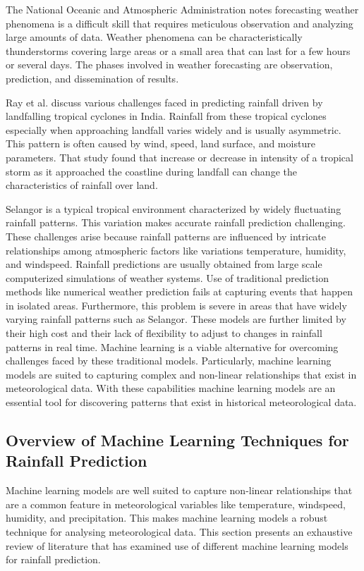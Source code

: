 \documentclass{article}
\begin{document}
The National Oceanic and Atmospheric Administration \cite{national_oceanic_and_atmospheric_administration_2024} notes forecasting
weather phenomena is a difficult skill that requires meticulous observation and analyzing large
amounts of data. Weather phenomena can be characteristically thunderstorms covering large
areas or a small area that can last for a few hours or several days. The phases involved in
weather forecasting are observation, prediction, and dissemination of results.

Ray et al. \cite{ray_et_al_2021} discuss various challenges faced in predicting rainfall driven by
landfalling tropical cyclones in India. Rainfall from these tropical cyclones especially when
approaching landfall varies widely and is usually asymmetric. This pattern is often caused by
wind, speed, land surface, and moisture parameters. That study found that increase or decrease
in intensity of a tropical storm as it approached the coastline during landfall can change the
characteristics of rainfall over land.

Selangor is a typical tropical environment characterized by widely fluctuating rainfall
patterns. This variation makes accurate rainfall prediction challenging. These challenges arise
because rainfall patterns are influenced by intricate relationships among atmospheric factors
like variations temperature, humidity, and windspeed. Rainfall predictions are usually obtained
from large scale computerized simulations of weather systems. Use of traditional prediction
methods like numerical weather prediction fails at capturing events that happen in isolated
areas. Furthermore, this problem is severe in areas that have widely varying rainfall patterns
such as Selangor. These models are further limited by their high cost and their lack of flexibility
to adjust to changes in rainfall patterns in real time. Machine learning is a viable alternative for
overcoming challenges faced by these traditional models. Particularly, machine learning
models are suited to capturing complex and non-linear relationships that exist in meteorological
data. With these capabilities machine learning models are an essential tool for discovering
patterns that exist in historical meteorological data.

\subsection{Overview of Machine Learning Techniques for Rainfall Prediction}

Machine learning models are well suited to capture non-linear relationships that are a
common feature in meteorological variables like temperature, windspeed, humidity, and
precipitation. This makes machine learning models a robust technique for analysing
meteorological data. This section presents an exhaustive review of literature that has examined
use of different machine learning models for rainfall prediction.
\end{document}
